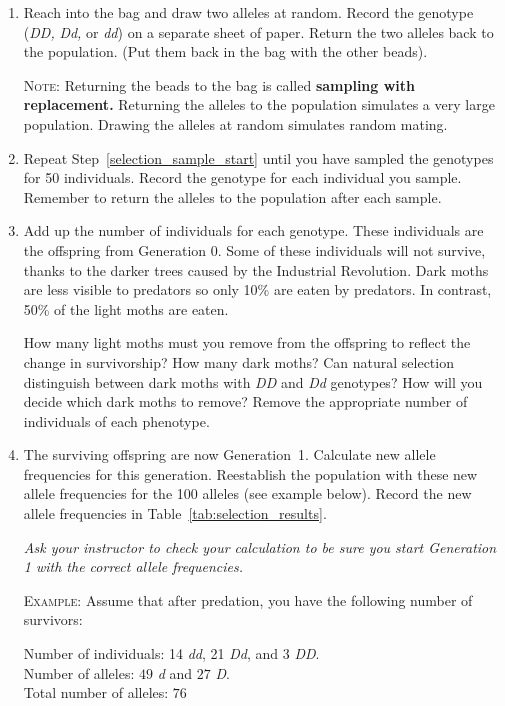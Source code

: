 \documentclass[12pt]{exam}
\newcommand{\allele}[1]{\textit{#1}}
\begin{document}
\begin{questions}
\begin{enumerate}
	\item \label{selection_sample_start} Reach into the bag and draw two alleles at random. Record the genotype (\allele{DD,} \allele{Dd,} or \allele{dd}) on a separate sheet of paper. Return the two alleles back to the population. (Put them back in the bag with the other beads).
	
	\textsc{Note:} Returning the beads to the bag is called \textbf{sampling with replacement.} Returning the alleles to the population simulates a very large population. Drawing the alleles at random simulates random mating.
	
	\item Repeat Step~\ref{selection_sample_start} until you have sampled the genotypes for 50 individuals. Record the genotype for each individual you sample. Remember to return the alleles to the population after each sample. 
	
	\item Add up the number of individuals for each genotype. These individuals are the offspring from Generation 0. Some of these individuals will not survive, thanks to the darker trees caused by the Industrial Revolution. Dark moths are less visible to predators so only 10\% are eaten by predators. In contrast, 50\% of the light moths are eaten. 
	
	How many light moths must you remove from the offspring to reflect the change in survivorship? How many dark moths? Can natural selection distinguish between dark moths with \allele{DD} and \allele{Dd} genotypes? How will you decide which dark moths to remove? Remove the appropriate number of individuals of each phenotype.
	
	\item \label{selection_sample_stop} The surviving offspring are now Generation~1. Calculate new allele frequencies for this generation. Reestablish the population with these new allele frequencies for the 100 alleles (see example below). Record the new allele frequencies in Table~\ref{tab:selection_results}.
	
	\textit{Ask your instructor to check your calculation to be sure you start Generation 1 with the correct allele frequencies.}
	
	\textsc{Example:} Assume that after predation, you have the following number of survivors:
	
	Number of individuals: 14 \allele{dd}, 21 \allele{Dd}, and 3 \allele{DD}.\\
	Number of alleles: $49$ \allele{d} and $27$ \allele{D}.\\
	Total number of alleles: $76$


\end{enumerate}
\end{questions}
\end{document}

